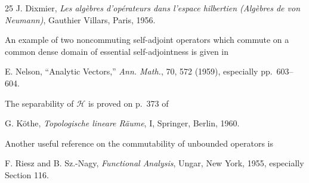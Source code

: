 \begin{thebibliography}{25}
J. Dixmier, \emph{Les alg\`ebres d'op\'erateurs dans l'espace hilbertien
(Alg\`ebres de von Neumann)}, Gauthier Villars, Paris, 1956.

An example of two noncommuting self-adjoint operators which commute on a
common dense domain of essential self-adjointness is given in

E. Nelson, ``Analytic Vectors,'' \emph{Ann. Math.}, 70, 572 (1959), especially
pp.~603--604.

The separability of $\mathcal{H}$ is proved on p.~373 of

G. K\"othe, \emph{Topologische lineare R\"aume}, I, Springer, Berlin, 1960.

Another useful reference on the commutability of unbounded operators is

F. Riesz and B. Sz.-Nagy, \emph{Functional Analysis}, Ungar, New York, 1955,
especially Section 116.
\end{thebibliography}
